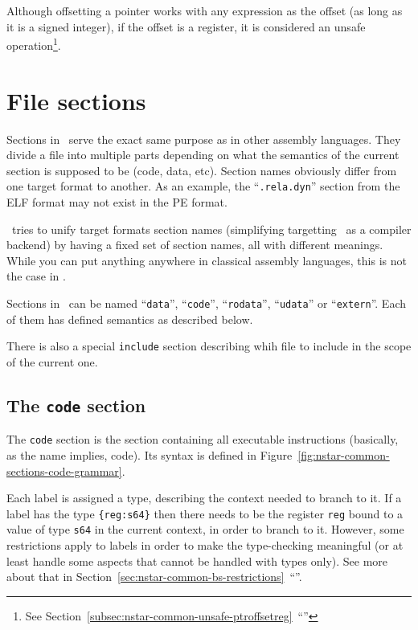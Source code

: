 Although offsetting a pointer works with any expression as the offset (as long as it is a signed integer), if the offset is a register, it is considered an unsafe operation\footnote{See Section~\ref{subsec:nstar-common-unsafe-ptroffsetreg}~``''}.

\section{File sections}\label{sec:nstar-common-sections}

Sections in \nstar\ serve the exact same purpose as in other assembly languages. They divide a file into multiple parts depending on what the semantics of the current section is supposed to be (code, data, etc).
Section names obviously differ from one target format to another. As an example, the ``\texttt{.rela.dyn}'' section from the ELF format may not exist in the PE format.

\nstar\ tries to unify target formats section names (simplifying targetting \nstar\ as a compiler backend) by having a fixed set of section names, all with different meanings. While you can put anything anywhere in classical assembly languages, this is not the case in \nstar.

Sections in \nstar\ can be named ``\texttt{data}'', ``\texttt{code}'', ``\texttt{rodata}'', ``\texttt{udata}'' or ``\texttt{extern}''. Each of them has defined semantics as described below.

There is also a special \texttt{include} section describing whih file to include in the scope of the current one.

\subsection{The \texttt{code} section}\label{subsec:nstar-common-sections-code}

The \texttt{code} section is the section containing all executable instructions (basically, as the name implies, code).
Its syntax is defined in Figure~\ref{fig:nstar-common-sections-code-grammar}.

Each label is assigned a type, describing the context needed to branch to it.
If a label has the type \texttt{\{reg:s64\}} then there needs to be the register \texttt{reg} bound to a value of type \texttt{s64} in the current context, in order to branch to it.
However, some restrictions apply to labels in order to make the type-checking meaningful (or at least handle some aspects that cannot be handled with types only). See more about that in Section~\ref{sec:nstar-common-bs-restrictions}~``''.

